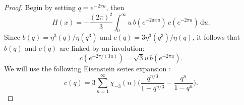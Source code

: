 \documentclass[12pt,reqno]{amsart}
\theoremstyle{remark}
\begin{document}
\begin{proof}
Begin by setting $q=e^{-2\pi u}$, then
\begin{equation*}
H(x)=-\frac{(2\pi)^2}{3}\int_{0}^{\infty}u\,b(e^{-2\pi x
u})\,c(e^{-2\pi u})\,{{\mathrm d}} u.
\end{equation*}
Since $b(q)=\eta^3(q)/\eta(q^3)$ and $c(q)=3\eta^3(q^3)/\eta(q)$, it follows that $b(q)$ and $c(q)$ are linked by an involution:
\begin{equation*}
c\left(e^{-2\pi/(3u)}\right)=\sqrt{3} u\, b\left(e^{-2\pi u}\right).
\end{equation*}
We will use the following Eisenstein series expansion \cite[pg.~406]{BA}:
\begin{equation*}
c(q)=3\sum_{n=1}^{\infty}\chi_{-3}(n)\biggl(\frac{q^{n/3}}{1-q^{n/3}}-\frac{q^n}{1-q^n}\biggr).
\end{equation*}


\end{proof}
\end{document}
